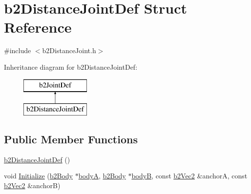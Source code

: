 \hypertarget{structb2_distance_joint_def}{}\section{b2\+Distance\+Joint\+Def Struct Reference}
\label{structb2_distance_joint_def}


{\ttfamily \#include $<$b2\+Distance\+Joint.\+h$>$}

Inheritance diagram for b2\+Distance\+Joint\+Def\+:\begin{figure}[H]
\begin{center}
\leavevmode
\includegraphics[height=2.000000cm]{structb2_distance_joint_def}
\end{center}
\end{figure}
\subsection*{Public Member Functions}
\begin{DoxyCompactItemize}
\item 
\mbox{\hyperlink{structb2_distance_joint_def_a91925a15ed268144ddc9df04f935801c}{b2\+Distance\+Joint\+Def}} ()
\item 
void \mbox{\hyperlink{structb2_distance_joint_def_a99788a534638cc28cd1e44e0036503f0}{Initialize}} (\mbox{\hyperlink{classb2_body}{b2\+Body}} $\ast$\mbox{\hyperlink{structb2_joint_def_a8cd54c93da396be75a9788f2c6897f05}{bodyA}}, \mbox{\hyperlink{classb2_body}{b2\+Body}} $\ast$\mbox{\hyperlink{structb2_joint_def_aa4f4dee2fbcd12187b19506b60e68e3d}{bodyB}}, const \mbox{\hyperlink{structb2_vec2}{b2\+Vec2}} \&anchorA, const \mbox{\hyperlink{structb2_vec2}{b2\+Vec2}} \&anchorB)
\end{DoxyCompactItemize}
